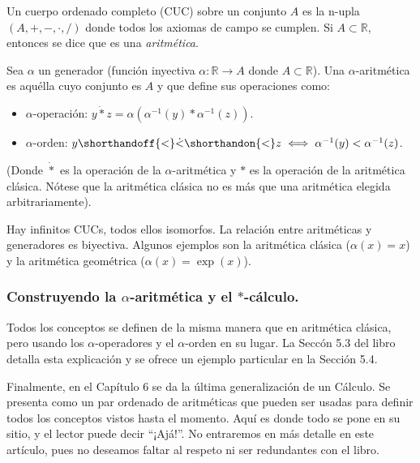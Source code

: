 Un cuerpo ordenado completo (CUC) sobre un conjunto $A$ es la n-upla $(A, +, -, \cdot, /)$ donde todos los axiomas de campo se cumplen. Si $A \subset \mathbb{R}$, entonces se dice que es una \textit{aritmética}.

Sea $\alpha$ un generador (función inyectiva $\alpha: \mathbb{R} \to A$ donde $A \subset \mathbb{R}$). Una $\alpha$-aritmética es aquélla cuyo conjunto es $A$ y que define sus operaciones como:

\newcommand{\lessdot}{\shorthandoff{<}\dot{<}\shorthandon{<}}

\begin{otherlanguage}{english}
\begin{itemize}
	\item $\alpha$-operación: $y \dot{*} z = \alpha(\alpha^{-1}(y) * \alpha^{-1}(z))$.
	\item $\alpha$-orden: $y \lessdot z \iff \alpha^{-1}(y) < \alpha^{-1}(z)$.
\end{itemize}
\end{otherlanguage}

(Donde $\dot{*}$ es la operación de la $\alpha$-aritmética y $*$ es la operación de la aritmética clásica. Nótese que la aritmética clásica no es más que una aritmética elegida arbitrariamente).

Hay infinitos CUCs, todos ellos isomorfos. La relación entre aritméticas y generadores es biyectiva. Algunos ejemplos son la aritmética clásica ($\alpha(x) = x$) y la aritmética geométrica ($\alpha(x) = \exp(x)$).

\subsubsection{Construyendo la $\alpha$-aritmética y el $*$-cálculo.}

Todos los conceptos se definen de la misma manera que en aritmética clásica, pero usando los $\alpha$-operadores y el $\alpha$-orden en su lugar. La Seccón 5.3 del libro detalla esta explicación y se ofrece un ejemplo particular en la Sección 5.4.

Finalmente, en el Capítulo 6 se da la última generalización de un Cálculo. Se presenta como un par ordenado de aritméticas que pueden ser usadas para definir todos los conceptos vistos hasta el momento. Aquí es donde todo se pone en su sitio, y el lector puede decir \enquote{¡Ajá!}. No entraremos en más detalle en este artículo, pues no deseamos faltar al respeto ni ser redundantes con el libro.

\newpage
